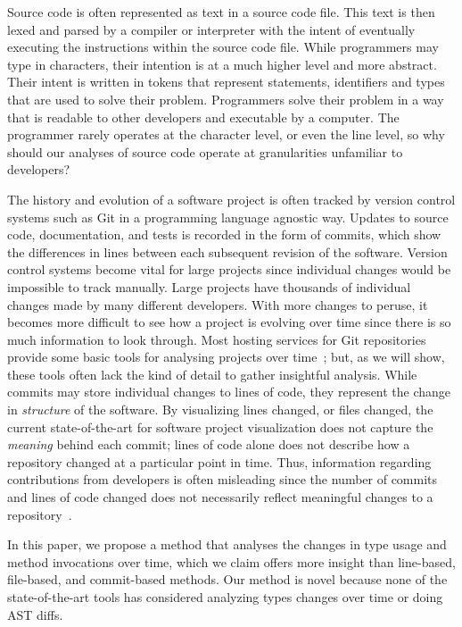 \documentclass[conference]{IEEEtran}
\begin{document}
Source code is often represented as text in a source code file. This text is then lexed and parsed by a compiler or interpreter with the intent of eventually executing the instructions within the source code file. While programmers may type in characters, their intention is at a much higher level and more abstract. Their intent is written in tokens that represent statements, identifiers and types that are used to solve their problem. Programmers solve their problem in a way that is readable to other developers and executable by a computer. The programmer rarely operates at the character level, or even the line level, so why should our analyses of source code operate at granularities unfamiliar to developers?

The history and evolution of a software project is often tracked by version control systems such as Git in a programming language agnostic way. Updates to source code, documentation, and tests is recorded in the form of commits, which show the differences in lines between each subsequent revision of the software. Version control systems become vital for large projects since individual changes would be impossible to track manually. Large projects have thousands of individual changes made by many different developers. With more changes to peruse, it becomes more difficult to see how a project is evolving over time since there is so much information to look through. Most hosting services for Git repositories provide some basic tools for analysing projects over time~\cite{github-graphs,bitbucket-graphs}; but, as we will show, these tools often lack the kind of detail to gather insightful analysis. While commits may store individual changes to lines of code, they represent the change in \emph{structure} of the software.  By visualizing lines changed, or files changed, the current state-of-the-art for software project visualization does not capture the \emph{meaning} behind each commit; lines of code alone does not describe how a repository changed at a particular point in time. Thus, information regarding contributions from developers is often misleading since the number of commits and lines of code changed does not necessarily reflect meaningful changes to a repository~\cite{robles2014}.

In this paper, we propose a method that analyses the changes in type usage and method invocations over time, which we claim offers more insight than line-based, file-based, and commit-based methods. Our method is novel because none of the state-of-the-art tools has considered analyzing types changes over time or doing AST diffs.
\end{document}
